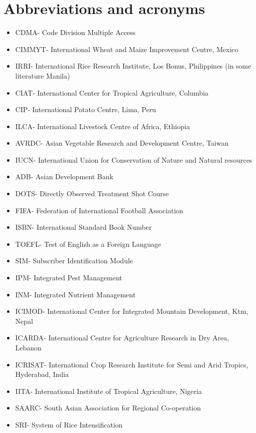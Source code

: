 \documentclass[
  openany]{book}
\providecommand{\tightlist}{%
  \setlength{\itemsep}{0pt}\setlength{\parskip}{0pt}}
\begin{document}
\hypertarget{abbreviations-and-acronyms}{%
\section{Abbreviations and acronyms}\label{abbreviations-and-acronyms}}

\begin{itemize}
\tightlist
\item
  CDMA- Code Division Multiple Access
\item
  CIMMYT- International Wheat and Maize Improvement Centre, Mexico
\item
  IRRI- International Rice Research Institute, Los Bonus, Philippines (in some literature Manila)
\item
  CIAT- International Center for Tropical Agriculture, Columbia
\item
  CIP- International Potato Centre, Lima, Peru
\item
  ILCA- International Livestock Centre of Africa, Ethiopia
\item
  AVRDC- Asian Vegetable Research and Development Centre, Taiwan
\item
  IUCN- International Union for Conservation of Nature and Natural resources
\item
  ADB- Asian Development Bank
\item
  DOTS- Directly Observed Treatment Shot Course
\item
  FIFA- Federation of International Football Association
\item
  ISBN- International Standard Book Number
\item
  TOEFL- Test of English as a Foreign Language
\item
  SIM- Subscriber Identification Module
\item
  IPM- Integrated Pest Management
\item
  INM- Integrated Nutrient Management
\item
  ICIMOD- International Center for Integrated Mountain Development, Ktm, Nepal
\item
  ICARDA- International Centre for Agriculture Research in Dry Area, Lebanon
\item
  ICRISAT- International Crop Research Institute for Semi and Arid Tropics, Hyderabad, India
\item
  IITA- International Institute of Tropical Agriculture, Nigeria
\item
  SAARC- South Asian Association for Regional Co-operation
\item
  SRI- System of Rice Intensification
\end{itemize}
\end{document}
